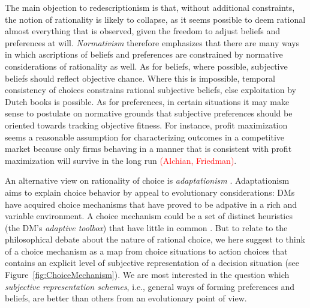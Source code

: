 \documentclass[fleqn,reqno,11pt]{article}
\newcommand{\myalert}[1]{\textcolor{red}{#1}}
\begin{document}
The main objection to redescriptionism is that, without additional constraints, the notion of
rationality is likely to collapse, as it seems possible to deem rational almost everything that
is observed, given the freedom to adjust beliefs and preferences at will. \emph{Normativism}
therefore emphasizes that there are many ways in which ascriptions of beliefs and preferences
are constrained by normative considerations of rationality as well. As for beliefs, where
possible, subjective beliefs should reflect objective chance. Where this is impossible,
temporal consistency of choices constrains rational subjective beliefs, else exploitation by
Dutch books is possible. As for preferences, in certain situations it may make sense to
postulate on normative grounds that subjective preferences should be oriented towards tracking
objective fitness. For instance, profit maximization seems a reasonable assumption for
characterizing outcomes in a competitive market because only firms behaving in a manner that is
consistent with profit maximization will survive in the long run \myalert{(Alchian,
  Friedman)}.

An alternative view on rationality of choice is \emph{adaptationism}
\citep[e.g.,][]{Anderson1991:Is-human-cognit,ChaterOaksford2000:The-Rational-An,HagenChater2012:Decision-Making}.  Adaptationism aims to explain choice behavior by appeal to evolutionary
considerations: DMs have acquired choice mechanisms that have proved to be adpative in a rich
and variable environment. A choice mechanism could be a set of distinct heuristics (the DM's
\emph{adaptive toolbox}) that have little in common
\citep[e.g.,][]{TverskyKahnemann1981:The-Framing-of-,GigerenzerGoldstein1996:Reasoning-the-F,ScheibehenneRieskamp2013:Testing-the-Ada}. But
to relate to the philosophical debate about the nature of rational choice, we here suggest to
think of a choice mechanism as a map from choice situations to action choices that contains an
explicit level of subjective representation of a decision situation (see
Figure~\ref{fig:ChoiceMechanism}). We are most interested in the question which
\emph{subjective representation schemes}, i.e., general ways of forming preferences and
beliefs, are better than others from an evolutionary point of view.
\end{document}
